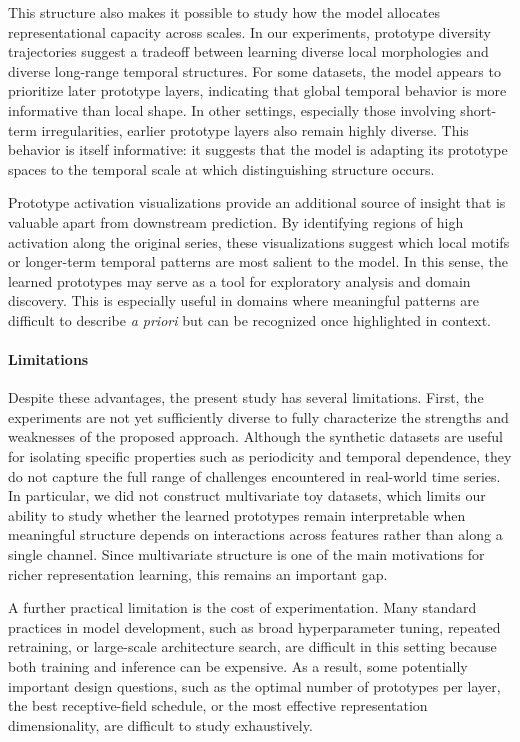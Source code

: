 \documentclass{article}
\begin{document}
This structure also makes it possible to study how the model allocates representational capacity across scales. In our experiments, prototype diversity trajectories suggest a tradeoff between learning diverse local morphologies and diverse long-range temporal structures. For some datasets, the model appears to prioritize later prototype layers, indicating that global temporal behavior is more informative than local shape. In other settings, especially those involving short-term irregularities, earlier prototype layers also remain highly diverse. This behavior is itself informative: it suggests that the model is adapting its prototype spaces to the temporal scale at which distinguishing structure occurs. 

Prototype activation visualizations provide an additional source of insight that is valuable apart from downstream prediction. By identifying regions of high activation along the original series, these visualizations suggest which local motifs or longer-term temporal patterns are most salient to the model. In this sense, the learned prototypes may serve as a tool for exploratory analysis and domain discovery. This is especially useful in domains where meaningful patterns are difficult to describe \textit{a priori} but can be recognized once highlighted in context.

\paragraph{Limitations} Despite these advantages, the present study has several limitations. First, the experiments are not yet sufficiently diverse to fully characterize the strengths and weaknesses of the proposed approach. Although the synthetic datasets are useful for isolating specific properties such as periodicity and temporal dependence, they do not capture the full range of challenges encountered in real-world time series. In particular, we did not construct multivariate toy datasets, which limits our ability to study whether the learned prototypes remain interpretable when meaningful structure depends on interactions across features rather than along a single channel. Since multivariate structure is one of the main motivations for richer representation learning, this remains an important gap.

A further practical limitation is the cost of experimentation. Many standard practices in model development, such as broad hyperparameter tuning, repeated retraining, or large-scale architecture search, are difficult in this setting because both training and inference can be expensive. As a result, some potentially important design questions, such as the optimal number of prototypes per layer, the best receptive-field schedule, or the most effective representation dimensionality, are difficult to study exhaustively.
\end{document}
